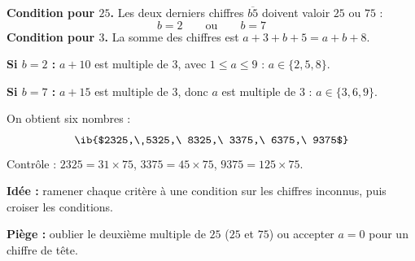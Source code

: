 \begin{enumerate}
  \textbf{Condition pour $25$.} Les deux derniers chiffres $\overline{b5}$ doivent valoir $25$ ou $75$ :
  \[b=2\qquad\text{ou}\qquad b=7\]
  \textbf{Condition pour $3$.} La somme des chiffres est $a+3+b+5=a+b+8$.

  \textbf{Si $b=2$ :} $a+10$ est multiple de $3$, avec $1\leq a\leq9$ : $a\in\{2,5,8\}$.

  \textbf{Si $b=7$ :} $a+15$ est multiple de $3$, donc $a$ est multiple de $3$ : $a\in\{3,6,9\}$.

  On obtient six nombres :
  \[\ib{$2325,\ 5325,\ 8325,\ 3375,\ 6375,\ 9375$}\]
  Contrôle : $2325=31\times75$, $3375=45\times75$, $9375=125\times75$.
\end{enumerate}
\textbf{Idée :} ramener chaque critère à une condition sur les chiffres inconnus, puis croiser les conditions.

\textbf{Piège :} oublier le deuxième multiple de $25$ ($25$ et $75$) ou accepter $a=0$ pour un chiffre de tête.
